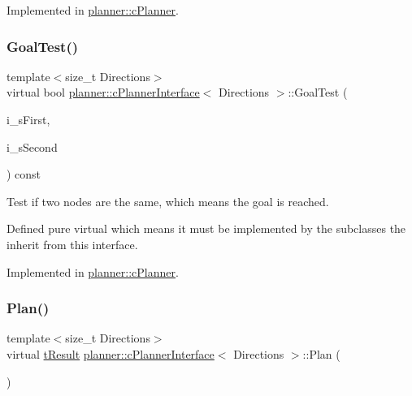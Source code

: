 Implemented in \mbox{\hyperlink{classplanner_1_1c_planner_adbffc6ce05119c940a09369d7e61554e}{planner\+::c\+Planner}}.

\mbox{\label{classplanner_1_1c_planner_interface_afec836d58ce54c49046bf30ecdebbfec}} 
\subsubsection{\texorpdfstring{Goal\+Test()}{GoalTest()}}
{\footnotesize\ttfamily template$<$size\+\_\+t Directions$>$ \\
virtual bool \mbox{\hyperlink{classplanner_1_1c_planner_interface}{planner\+::c\+Planner\+Interface}}$<$ Directions $>$\+::Goal\+Test (\begin{DoxyParamCaption}\item[{std\+::shared\+\_\+ptr$<$ \mbox{\hyperlink{structplanner_1_1t_node}{t\+Node}} $>$ \&}]{i\+\_\+s\+First,  }\item[{std\+::shared\+\_\+ptr$<$ \mbox{\hyperlink{structplanner_1_1t_node}{t\+Node}} $>$ \&}]{i\+\_\+s\+Second }\end{DoxyParamCaption}) const\hspace{0.3cm}{\ttfamily [pure virtual]}}



Test if two nodes are the same, which means the goal is reached. 

Defined pure virtual which means it must be implemented by the subclasses the inherit from this interface. 

Implemented in \mbox{\hyperlink{classplanner_1_1c_planner_a6b7554394efd7ad10d76a49b370aa62f}{planner\+::c\+Planner}}.

\mbox{\label{classplanner_1_1c_planner_interface_a7a06632a8c53906daf39611d9692ffa5}} 
\subsubsection{\texorpdfstring{Plan()}{Plan()}}
{\footnotesize\ttfamily template$<$size\+\_\+t Directions$>$ \\
virtual \mbox{\hyperlink{structt_result}{t\+Result}} \mbox{\hyperlink{classplanner_1_1c_planner_interface}{planner\+::c\+Planner\+Interface}}$<$ Directions $>$\+::Plan (\begin{DoxyParamCaption}{ }\end{DoxyParamCaption})\hspace{0.3cm}{\ttfamily [pure virtual]}}



